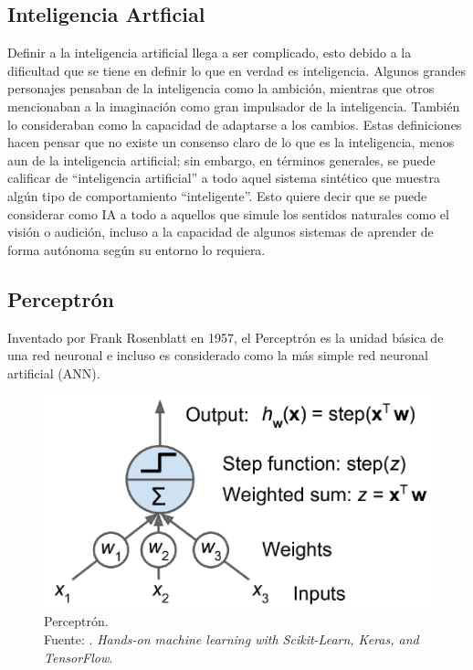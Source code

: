\subsection{Inteligencia Artficial}
Definir a la inteligencia artificial llega a ser complicado, esto debido a la dificultad que se tiene en definir lo que en verdad es inteligencia. Algunos grandes personajes pensaban de la inteligencia como la ambición, mientras que otros mencionaban a la imaginación como gran impulsador de la inteligencia. También lo consideraban como la capacidad de adaptarse a los cambios. Estas definiciones hacen pensar que no existe un consenso claro de lo que es la inteligencia, menos aun de la inteligencia artificial; sin embargo, en términos generales, se puede calificar de “inteligencia artificial” a todo aquel sistema sintético que muestra algún tipo de comportamiento “inteligente”. Esto quiere decir que se puede considerar como IA a todo a aquellos que simule los sentidos naturales como el visión o audición, incluso a la capacidad de algunos sistemas de aprender de forma autónoma según su entorno lo requiera. \parencite{bk_hurbans2020grokking}

\subsection{Perceptrón}
Inventado por Frank Rosenblatt en 1957, el Perceptrón es la unidad básica de una red neuronal e incluso es considerado como la más simple red neuronal artificial (ANN). \parencite{bk_geron2022handml}

\begin{figure}[H]
	\begin{center}
		\includegraphics[width=1.00\textwidth]{2/figures/perceptron.png}
		\caption[Perceptrón]{Perceptrón. \\
		Fuente: \cite{bk_geron2022handml}. \textit{Hands-on machine learning with Scikit-Learn, Keras, and TensorFlow}.}
		\label{2:fig207}
	\end{center}
\end{figure}


